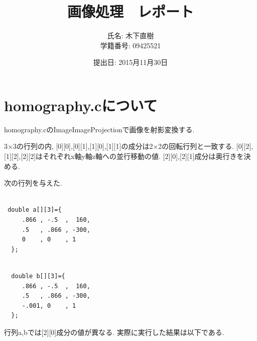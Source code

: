 \documentclass[a4j]{jarticle}
\title{画像処理　レポート}
\author{氏名: 木下直樹\\学籍番号: 09425521}
\date{提出日: 2015月11月30日}
\begin{document}
\maketitle

\section{homography.cについて}
homography.cのImageImageProjectionで画像を射影変換する.

3×3の行列の内, [0][0],[0][1],[1][0],[1][1]の成分は2×2の回転行列と一致する. 
[0][2],[1][2],[2][2]はそれぞれx軸y軸z軸への並行移動の値. 
[2][0],[2][1]成分は奥行きを決める.

次の行列を与えた. 

\begin{minipage}{0.5\hsize}
\begin{verbatim}

 double a[][3]={
     .866 , -.5  ,  160,
     .5   , .866 , -300,
     0    , 0    , 1
  };

\end{verbatim}
\end{minipage}

\begin{minipage}{0.5\hsize}
\begin{verbatim}

  double b[][3]={
     .866 , -.5  ,  160,
     .5   , .866 , -300,
     -.001, 0    , 1
  };

\end{verbatim}
\end{minipage}

行列a,bでは[2][0]成分の値が異なる. 実際に実行した結果は以下である. 
\end{document}
